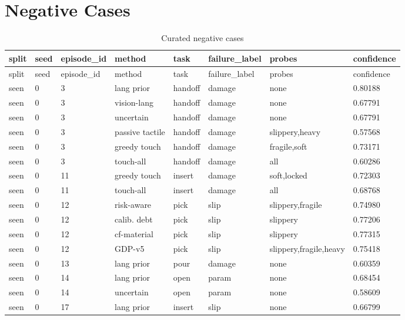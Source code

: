 \documentclass{article}
\begin{document}
\clearpage
\section{Negative Cases}

\begin{center}
\tiny
\renewcommand{\arraystretch}{0.92}
\setlength{\tabcolsep}{3pt}
\begin{longtable}{llllllll}
\caption{Curated negative cases}\label{tab:negative-cases}\\
\toprule
split & seed & episode\_id & method & task & failure\_label & probes & confidence \\
\midrule
\endfirsthead
\toprule
split & seed & episode\_id & method & task & failure\_label & probes & confidence \\
\midrule
\endhead
seen & 0 & 3 & lang prior & handoff & damage & none & 0.80188 \\
seen & 0 & 3 & vision-lang & handoff & damage & none & 0.67791 \\
seen & 0 & 3 & uncertain & handoff & damage & none & 0.67791 \\
seen & 0 & 3 & passive tactile & handoff & damage & slippery,heavy & 0.57568 \\
seen & 0 & 3 & greedy touch & handoff & damage & fragile,soft & 0.73171 \\
seen & 0 & 3 & touch-all & handoff & damage & all & 0.60286 \\
seen & 0 & 11 & greedy touch & insert & damage & soft,locked & 0.72303 \\
seen & 0 & 11 & touch-all & insert & damage & all & 0.68768 \\
seen & 0 & 12 & risk-aware & pick & slip & slippery,fragile & 0.74980 \\
seen & 0 & 12 & calib. debt & pick & slip & slippery & 0.77206 \\
seen & 0 & 12 & cf-material & pick & slip & slippery & 0.77315 \\
seen & 0 & 12 & GDP-v5 & pick & slip & slippery,fragile,heavy & 0.75418 \\
seen & 0 & 13 & lang prior & pour & damage & none & 0.60359 \\
seen & 0 & 14 & lang prior & open & param & none & 0.68454 \\
seen & 0 & 14 & uncertain & open & param & none & 0.58609 \\
seen & 0 & 17 & lang prior & insert & slip & none & 0.66799 \\
\bottomrule
\end{longtable}
\renewcommand{\arraystretch}{1.0}
\end{center}
\end{document}
